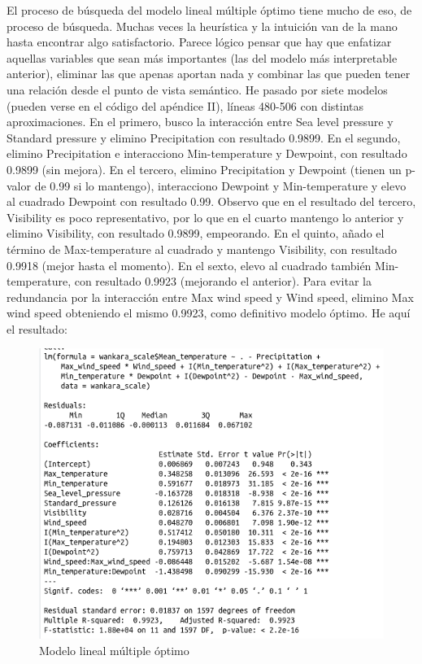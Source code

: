  El proceso de búsqueda del modelo lineal múltiple óptimo tiene mucho de eso, de proceso de búsqueda. Muchas veces la heurística y la intuición van de la mano hasta encontrar algo satisfactorio. Parece lógico pensar que hay que enfatizar aquellas variables que sean más importantes (las del modelo más interpretable anterior), eliminar las que apenas aportan nada y combinar las que pueden tener una relación desde el punto de vista semántico. He pasado por siete modelos  (pueden verse en el código del apéndice II), líneas 480-506 con distintas aproximaciones. En el primero, busco la interacción entre Sea level pressure y Standard pressure y elimino Precipitation con resultado 0.9899. En el segundo, elimino Precipitation e interacciono Min-temperature y Dewpoint, con resultado 0.9899 (sin mejora). En el tercero, elimino Precipitation y Dewpoint (tienen un p-valor de 0.99 si lo mantengo), interacciono Dewpoint y Min-temperature y elevo al cuadrado Dewpoint con resultado 0.99. Observo que en el resultado del tercero, Visibility es poco representativo, por lo que en el cuarto mantengo lo anterior y elimino Visibility, con resultado 0.9899, empeorando. En el quinto, añado el término de Max-temperature al cuadrado y mantengo Visibility, con resultado 0.9918 (mejor hasta el momento). En el sexto, elevo al cuadrado también Min-temperature, con resultado 0.9923 (mejorando el anterior). Para evitar la redundancia por la interacción entre Max wind speed y Wind speed, elimino Max wind speed obteniendo el mismo 0.9923, como definitivo modelo óptimo. He aquí el resultado:
 
 \begin{figure}[H] %
 	\centering
 	\includegraphics[scale=0.5]{optimo.png}  %
 	\caption{Modelo lineal múltiple óptimo} 
 	\label{fig:optimo}
 \end{figure}

